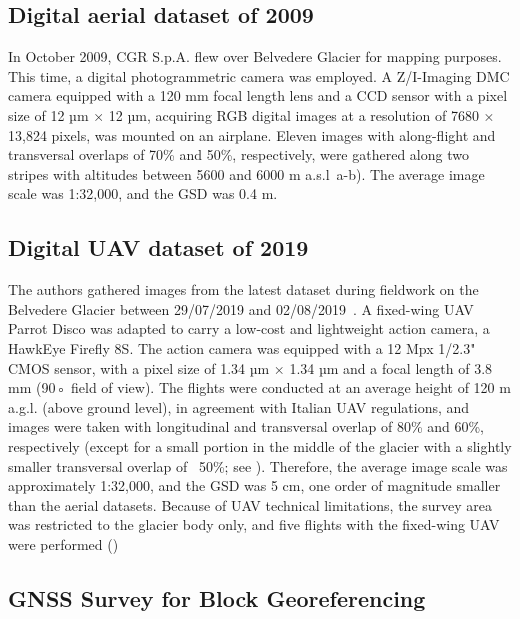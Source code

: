 \subsection{Digital aerial dataset of 2009}

In October 2009, CGR S.p.A. flew over Belvedere Glacier for mapping purposes. 
This time, a digital photogrammetric camera was employed.
A Z/I-Imaging DMC camera equipped with a 120 mm focal length lens and a CCD
sensor with a pixel size of 12 µm × 12 µm, acquiring RGB digital images at a resolution of 7680 × 13,824 pixels, was mounted on an airplane. 
Eleven images with along-flight and transversal overlaps of 70\% and 50\%, respectively, were gathered along two stripes with altitudes between 5600 and 6000 m a.s.l~a-b). 
The average image scale was 1:32,000, and the GSD was 0.4 m.

\subsection{Digital UAV dataset of 2019}

The authors gathered images from the latest dataset during fieldwork on the Belvedere Glacier between 29/07/2019 and 02/08/2019~\citep{Ioli2022}. 
A fixed-wing UAV Parrot Disco was adapted to carry a low-cost and lightweight action
camera, a HawkEye Firefly 8S. 
The action camera was equipped with a 12 Mpx 1/2.3" CMOS sensor, with a pixel size of 1.34 µm × 1.34 µm and a focal length of 3.8 mm (90◦ field of view). 
The flights were conducted at an average height of 120 m a.g.l. (above ground level), in agreement with Italian UAV regulations, and images were taken with longitudinal and transversal overlap of 80\% and 60\%, respectively (except for a small portion in the middle of the glacier with a slightly smaller transversal overlap of ~50\%; see ).
Therefore, the average image scale was approximately 1:32,000, and the GSD was 5 cm, one order of magnitude smaller than the aerial datasets. 
Because of UAV technical limitations, the survey area was restricted to the glacier body only, and five flights with the fixed-wing UAV were performed ()


\subsection{GNSS Survey for Block Georeferencing}\label{sec:2:datasets:gnss}

